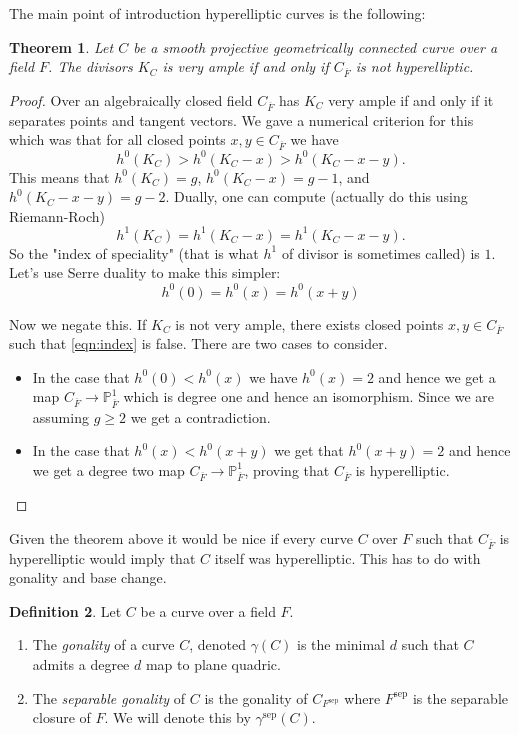 \documentclass[12pt]{article}
\numberwithin{equation}{section}
\newtheorem{theorem}{Theorem}[subsection]
\theoremstyle{definition}
\newtheorem{definition}[theorem]{Definition}
\theoremstyle{remark}
\newcommand{\PP}{\mathbb{P}}
\newcommand{\Fbar}{\overline{F}}
\newcommand{\sep}{\operatorname{sep}}
\begin{document}
The main point of introduction hyperelliptic curves is the following:
\begin{theorem}
	Let $C$ be a smooth projective geometrically connected curve over a field $F$. 
	The divisors $K_C$ is very ample if and only if $C_{\Fbar}$ is not hyperelliptic. 
\end{theorem}
\begin{proof}
	Over an algebraically closed field $C_{\Fbar}$ has $K_C$ very ample if and only if it separates points and tangent vectors. 
	We gave a numerical criterion for this which was that for all closed points $x,y\in C_{\Fbar}$ we have 
	$$ h^0(K_C)> h^0(K_C-x) > h^0(K_C-x-y). $$
	This means that $h^0(K_C)=g$, $h^0(K_C-x)=g-1$, and $h^0(K_C-x-y)=g-2$. 
	Dually, one can compute (actually do this using Riemann-Roch)
	$$h^1(K_C)=h^1(K_C-x)=h^1(K_C-x-y).$$
	So the "index of speciality" (that is what $h^1$ of divisor is sometimes called) is $1$. 
	Let's use Serre duality to make this simpler:
	\begin{equation}\label{eqn:index}
	h^0(0) = h^0(x) = h^0(x+y)
	\end{equation}
	
	Now we negate this. 
	If $K_C$ is not very ample, there exists closed points $x,y\in C_{\Fbar}$ such that \eqref{eqn:index} is false.
	There are two cases to consider. 
	\begin{itemize}
		\item In the case that $h^0(0)<h^0(x)$ we have $h^0(x)=2$ and hence we get a map $C_{\Fbar}\to \PP^1_{\Fbar}$ which is degree one and hence an isomorphism.
		Since we are assuming $g\geq 2$ we get a contradiction.
		\item In the case that $h^0(x)<h^0(x+y)$ we get that $h^0(x+y)=2$ and hence we get a degree two map $C_{\Fbar} \to \PP^1_{\Fbar}$, proving that $C_{\Fbar}$ is hyperelliptic. 
	\end{itemize}
	
	
\end{proof}

Given the theorem above it would be nice if every curve $C$ over $F$ such that $C_{\overline{F}}$ is hyperelliptic would imply that $C$ itself was hyperelliptic. 
This has to do with gonality and base change. 
\begin{definition}
	Let $C$ be a curve over a field $F$. 
	\begin{enumerate}
		\item 	The \emph{gonality} of a curve $C$, denoted $\gamma(C)$ is the minimal $d$ such that $C$ admits a degree $d$ map to plane quadric.
		\item The \emph{separable gonality} of $C$ is the gonality of $C_{F^{\sep}}$ where $F^{\sep}$ is the separable closure of $F$. 
		We will denote this by $\gamma^{\sep}(C)$. 
	\end{enumerate}
\end{definition}
\end{document}

